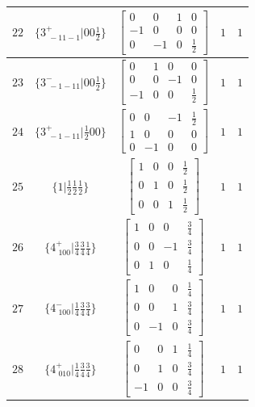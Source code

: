 \documentclass[fleqn,8pt]{jsarticle}
\begin{document}
\begin{longtable}{ccccc}
$ 22 $ & $ \{3^{+}_{\,\,-11-1}|0 0 \frac{1}{2}\} $ & $ \begin{bmatrix} 0 & 0 & 1 & 0 \\ -1 & 0 & 0 & 0 \\ 0 & -1 & 0 & \frac{1}{2} \end{bmatrix} $ & $ 1 $ & $ 1 $ \\ \hline
$ 23 $ & $ \{3^{-}_{\,\,-1-11}|0 0 \frac{1}{2}\} $ & $ \begin{bmatrix} 0 & 1 & 0 & 0 \\ 0 & 0 & -1 & 0 \\ -1 & 0 & 0 & \frac{1}{2} \end{bmatrix} $ & $ 1 $ & $ 1 $ \\ \hline
$ 24 $ & $ \{3^{+}_{\,\,-1-11}|\frac{1}{2} 0 0\} $ & $ \begin{bmatrix} 0 & 0 & -1 & \frac{1}{2} \\ 1 & 0 & 0 & 0 \\ 0 & -1 & 0 & 0 \end{bmatrix} $ & $ 1 $ & $ 1 $ \\ \hline
$ 25 $ & $ \{1|\frac{1}{2} \frac{1}{2} \frac{1}{2}\} $ & $ \begin{bmatrix} 1 & 0 & 0 & \frac{1}{2} \\ 0 & 1 & 0 & \frac{1}{2} \\ 0 & 0 & 1 & \frac{1}{2} \end{bmatrix} $ & $ 1 $ & $ 1 $ \\ \hline
$ 26 $ & $ \{4^{+}_{\,\,100}|\frac{3}{4} \frac{3}{4} \frac{1}{4}\} $ & $ \begin{bmatrix} 1 & 0 & 0 & \frac{3}{4} \\ 0 & 0 & -1 & \frac{3}{4} \\ 0 & 1 & 0 & \frac{1}{4} \end{bmatrix} $ & $ 1 $ & $ 1 $ \\ \hline
$ 27 $ & $ \{4^{-}_{\,\,100}|\frac{1}{4} \frac{3}{4} \frac{3}{4}\} $ & $ \begin{bmatrix} 1 & 0 & 0 & \frac{1}{4} \\ 0 & 0 & 1 & \frac{3}{4} \\ 0 & -1 & 0 & \frac{3}{4} \end{bmatrix} $ & $ 1 $ & $ 1 $ \\ \hline
$ 28 $ & $ \{4^{+}_{\,\,010}|\frac{1}{4} \frac{3}{4} \frac{3}{4}\} $ & $ \begin{bmatrix} 0 & 0 & 1 & \frac{1}{4} \\ 0 & 1 & 0 & \frac{3}{4} \\ -1 & 0 & 0 & \frac{3}{4} \end{bmatrix} $ & $ 1 $ & $ 1 $ \\ \hline

\end{longtable}
\end{document}

